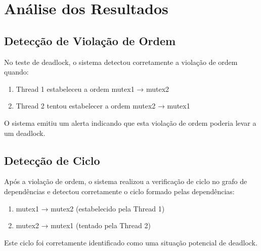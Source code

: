 \section{Análise dos Resultados}

\subsection{Detecção de Violação de Ordem}

No teste de deadlock, o sistema detectou corretamente a violação de ordem quando:

\begin{enumerate}
    \item Thread 1 estabeleceu a ordem mutex1 → mutex2
    \item Thread 2 tentou estabelecer a ordem mutex2 → mutex1
\end{enumerate}

O sistema emitiu um alerta indicando que esta violação de ordem poderia levar a um deadlock.

\subsection{Detecção de Ciclo}

Após a violação de ordem, o sistema realizou a verificação de ciclo no grafo de dependências e detectou corretamente o ciclo formado pelas dependências:

\begin{enumerate}
    \item mutex1 → mutex2 (estabelecido pela Thread 1)
    \item mutex2 → mutex1 (tentado pela Thread 2)
\end{enumerate}

Este ciclo foi corretamente identificado como uma situação potencial de deadlock.
